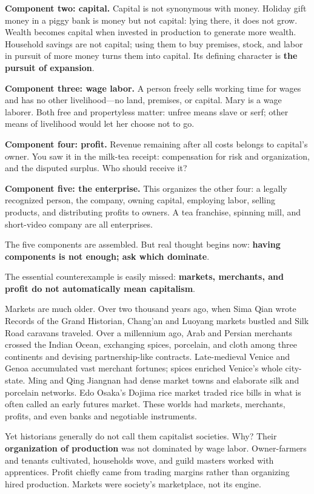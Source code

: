 \textbf{Component two: capital.} Capital is not synonymous with money. Holiday gift money in a piggy bank is money but not capital: lying there, it does not grow. Wealth becomes capital when invested in production to generate more wealth. Household savings are not capital; using them to buy premises, stock, and labor in pursuit of more money turns them into capital. Its defining character is \textbf{the pursuit of expansion}.

\textbf{Component three: wage labor.} A person freely sells working time for wages and has no other livelihood---no land, premises, or capital. Mary is a wage laborer. Both free and propertyless matter: unfree means slave or serf; other means of livelihood would let her choose not to go.

\textbf{Component four: profit.} Revenue remaining after all costs belongs to capital's owner. You saw it in the milk-tea receipt: compensation for risk and organization, and the disputed surplus. Who should receive it?

\textbf{Component five: the enterprise.} This organizes the other four: a legally recognized person, the company, owning capital, employing labor, selling products, and distributing profits to owners. A tea franchise, spinning mill, and short-video company are all enterprises.

The five components are assembled. But real thought begins now: \textbf{having components is not enough; ask which dominate}.

The essential counterexample is easily missed: \textbf{markets, merchants, and profit do not automatically mean capitalism}.

Markets are much older. Over two thousand years ago, when Sima Qian wrote Records of the Grand Historian, Chang'an and Luoyang markets bustled and Silk Road caravans traveled. Over a millennium ago, Arab and Persian merchants crossed the Indian Ocean, exchanging spices, porcelain, and cloth among three continents and devising partnership-like contracts. Late-medieval Venice and Genoa accumulated vast merchant fortunes; spices enriched Venice's whole city-state. Ming and Qing Jiangnan had dense market towns and elaborate silk and porcelain networks. Edo Osaka's Dojima rice market traded rice bills in what is often called an early futures market. These worlds had markets, merchants, profits, and even banks and negotiable instruments.

Yet historians generally do not call them capitalist societies. Why? Their \textbf{organization of production} was not dominated by wage labor. Owner-farmers and tenants cultivated, households wove, and guild masters worked with apprentices. Profit chiefly came from trading margins rather than organizing hired production. Markets were society's marketplace, not its engine.


